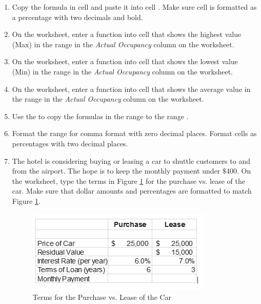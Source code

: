\begin{enumbox}
\begin{enumerate}
		\item Copy the formula in cell  and paste it into cell . Make sure cell  is formatted as a percentage with two decimals and bold.
		
		\item On the  worksheet, enter a function into cell  that shows the highest value (Max) in the range  in the \textit{Actual Occupancy} column on the  worksheet.
		
		\item On the  worksheet, enter a function into cell  that shows the lowest value (Min) in the range  in the \textit{Actual Occupancy} column on the  worksheet.
		
		\item On the  worksheet, enter a function into cell  that shows the average value in the range  in the \textit{Actual Occupancy} column on the  worksheet.
		
		\item Use the  to copy the formulas in the range  to the range .
		
		\item Format the range  for comma format with zero decimal places. Format cells  as percentages with two decimal places.
		
		\item The hotel is considering buying or leasing a car to shuttle customers to and from the airport. The hope is to keep the monthly payment under $ \$400 $. On the  worksheet, type the terms in Figure \ref{02:fig50} for the purchase vs. lease of the car. Make sure that dollar amounts and percentages are formatted to match Figure \ref{02:fig50}.

		\begin{figure}[H]
			\centering
			\includegraphics[width=\maxwidth{.95\linewidth}]{gfx/ch02_fig50}
			\caption{Terms for the Purchase vs. Lease of the Car}
			\label{02:fig50}
		\end{figure}


\end{enumerate}
\end{enumbox}
